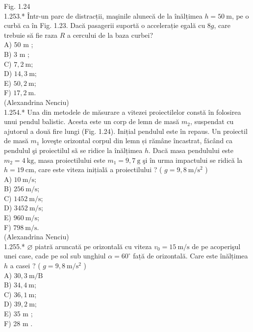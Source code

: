 \documentclass[10pt]{article}
\begin{document}
Fig. 1.24\\
1.253.* Într-un parc de distracții, maşinile alunecă de la înălțimea $h=50 \mathrm{~m}$, pe o curbă ca în Fig. 1.23. Dacă pasagerii suportă o accelerație egală cu $8 g$, care trebuie să fie raza $R$ a cercului de la baza curbei?\\
A) 50 m ;\\
B) 3 m ;\\
C) $7,2 \mathrm{~m}$;\\
D) $14,3 \mathrm{~m}$;\\
E) $50,2 \mathrm{~m}$;\\
F) $17,2 \mathrm{~m}$.\\
(Alexandrina Nenciu)\\
1.254.* Una din metodele de măsurare a vitezei proiectilelor constă în folosirea unui pendul balistic. Acesta este un corp de lemn de masă $m_{2}$, suspendat cu ajutorul a două fire lungi (Fig. 1.24). Inițial pendulul este în repaus. Un proiectil de masă $m_{1}$ loveşte orizontal corpul din lemn și rămâne încastrat, făcând ca pendulul şi proiectilul sã se ridice la înălțimea $h$. Dacă masa pendulului este $m_{2}=4 \mathrm{~kg}$, masa proiectilului este $m_{1}=9,7 \mathrm{~g}$ şi în urma impactului se ridică la $h=19 \mathrm{~cm}$, care este viteza inițială a proiectilului ? ( $g=9,8 \mathrm{~m} / \mathrm{s}^{2}$ )\\
A) $10 \mathrm{~m} / \mathrm{s}$;\\
B) $256 \mathrm{~m} / \mathrm{s}$;\\
C) $1452 \mathrm{~m} / \mathrm{s}$;\\
D) $3452 \mathrm{~m} / \mathrm{s}$;\\
E) $960 \mathrm{~m} / \mathrm{s}$;\\
F) $798 \mathrm{~m} / \mathrm{s}$.\\
(Alexandrina Nenciu)\\
1.255.* $\varnothing$ piatră aruncată pe orizontală cu viteza $v_{0}=15 \mathrm{~m} / \mathrm{s}$ de pe acoperişul unei case, cade pe sol sub unghiul $\alpha=60^{\circ}$ față de orizontală. Care este înălțimea $h$ a casei ? ( $g=9,8 \mathrm{~m} / \mathrm{s}^{2}$ )\\
A) $30,3 \mathrm{~m} / \mathrm{B}$\\
B) $34,4 \mathrm{~m}$;\\
C) $36,1 \mathrm{~m}$;\\
D) $39,2 \mathrm{~m}$;\\
E) 35 m ;\\
F) 28 m .\\
\end{document}
